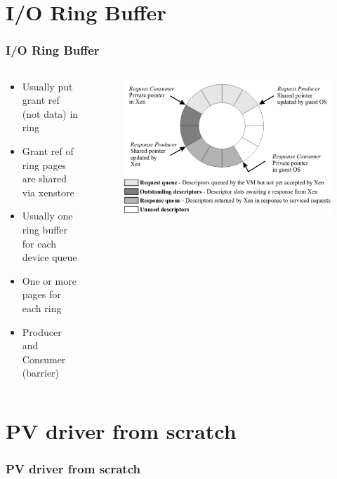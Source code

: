 \documentclass[aspectratio=169]{beamer}
\begin{document}
\section{I/O Ring Buffer}
\begin{frame}
\frametitle{I/O Ring Buffer}
\begin{columns}[c]
\begin{center}
\begin{itemize}
\item Usually put grant ref (not data) in ring
\item Grant ref of ring pages are shared via xenstore
\item Usually one ring buffer for each device queue
\item One or more pages for each ring
\item Producer and Consumer (barrier)
\end{itemize}
\end{center}
\begin{center}
\begin{figure}
\includegraphics[width=1.0\linewidth]{figures/ring.pdf}
\end{figure}
\end{center}
\end{columns}
\end{frame}


\section{PV driver from scratch}
\begin{frame}
\frametitle{PV driver from scratch}
\end{frame}
\end{document}
